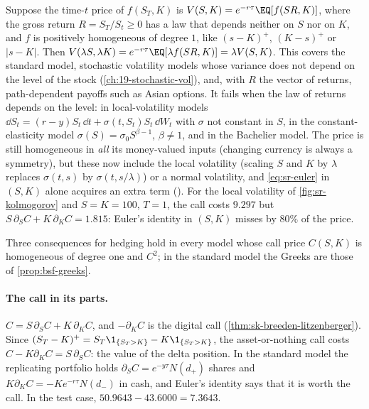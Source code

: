 \begin{remark}\label{rem:sr-homogeneous}
Suppose the time-$t$ price of $f(S_T,K)$ is $V(S,K)=e^{-r\tau}\EQ[f(SR,K)]$, where the gross return
$R=S_T/S_t\ge0$ has a law that depends neither on $S$ nor on $K$, and $f$ is positively homogeneous of degree
$1$, like $(s-K)^+$, $(K-s)^+$ or $|s-K|$. Then $V(\lambda S,\lambda K)=e^{-r\tau}\EQ[\lambda f(SR,K)]=\lambda V(S,K)$. This
covers the standard model, stochastic volatility models whose variance does not depend on the level of the
stock (\cref{ch:19-stochastic-vol}), and, with $R$ the vector of returns, path-dependent payoffs such as Asian
options. It fails when the law of returns depends on the level: in local-volatility models
$\dd S_t=(r-y)S_t\,\dd t+\sigma(t,S_t)S_t\,\dd W_t$ with $\sigma$ not constant in $S$, in the constant-elasticity model
$\sigma(S)=\sigma_0S^{\beta-1}$, $\beta\ne1$, and in the Bachelier model. The price is still homogeneous in \emph{all} its
money-valued inputs (changing currency is always a symmetry), but these now include the local volatility
(scaling $S$ and $K$ by $\lambda$ replaces $\sigma(t,s)$ by $\sigma(t,s/\lambda)$) or a normal volatility, and
\eqref{eq:sr-euler} in $(S,K)$ alone acquires an extra term (). For the local volatility
of \cref{fig:sr-kolmogorov} and $S=K=100$, $T=1$, the call costs $9.297$ but $S\,\partial_SC+K\,\partial_KC=1.815$:
Euler's identity in $(S,K)$ misses by $80\%$ of the price.
\end{remark}

Three consequences for hedging hold in every model whose call price $C(S,K)$ is homogeneous of degree one
and $C^2$; in the standard model the Greeks are those of \cref{prop:bsf-greeks}.

\paragraph{The call in its parts.} $C=S\,\partial_SC+K\,\partial_KC$, and $-\partial_KC$ is the digital call
(\cref{thm:sk-breeden-litzenberger}). Since $(S_T-K)^+=S_T\1_{\{S_T>K\}}-K\1_{\{S_T>K\}}$, the asset-or-nothing call
costs $C-K\partial_KC=S\,\partial_SC$: the value of the delta position. In the standard model the replicating
portfolio holds $\partial_SC=e^{-y\tau}N(d_+)$ shares and $K\partial_KC=-Ke^{-r\tau}N(d_-)$ in cash, and Euler's
identity says that it is worth the call. In the test case, $50.9643-43.6000=7.3643$.

